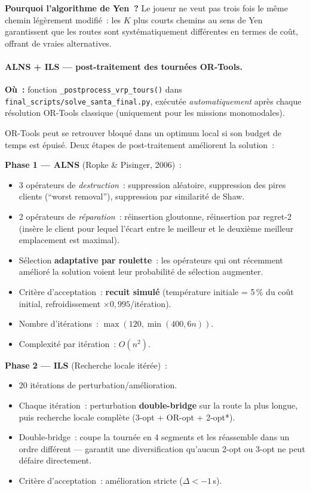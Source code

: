 \documentclass[a4paper, 12pt, twoside]{article}
\begin{document}
\textbf{Pourquoi l'algorithme de Yen~?}
Le joueur ne veut pas trois fois le m\^{e}me chemin l\'{e}g\`{e}rement modifi\'{e}~:
les $K$ plus courts chemins au sens de Yen garantissent que les routes sont
syst\'{e}matiquement diff\'{e}rentes en termes de co\^{u}t, offrant de vraies alternatives.

\paragraph{ALNS + ILS --- post-traitement des tourn\'{e}es OR-Tools.}

\textbf{O\`{u}~:} fonction \texttt{\_postprocess\_vrp\_tours()} dans
\texttt{final\_scripts/solve\_santa\_final.py}, ex\'{e}cut\'{e}e \emph{automatiquement}
apr\`{e}s chaque r\'{e}solution OR-Tools classique (uniquement pour les missions monomodales).

OR-Tools peut se retrouver bloqu\'{e} dans un optimum local si son budget de temps
est \'{e}puis\'{e}. Deux \'{e}tapes de post-traitement am\'{e}liorent la solution~:

\textbf{Phase 1 --- ALNS} (Ropke \& Pisinger, 2006)~:
\begin{itemize}
  \item 3 op\'{e}rateurs de \emph{destruction}~: suppression al\'{e}atoire, suppression
        des pires clients (``worst removal''), suppression par similarit\'{e} de Shaw.
  \item 2 op\'{e}rateurs de \emph{r\'{e}paration}~: r\'{e}insertion gloutonne, r\'{e}insertion
        par regret-2 (ins\`{e}re le client pour lequel l'\'{e}cart entre le meilleur et
        le deuxi\`{e}me meilleur emplacement est maximal).
  \item S\'{e}lection \textbf{adaptative par roulette}~: les op\'{e}rateurs qui ont
        r\'{e}cemment am\'{e}lior\'{e} la solution voient leur probabilit\'{e} de s\'{e}lection augmenter.
  \item Crit\`{e}re d'acceptation~: \textbf{recuit simul\'{e}} (temp\'{e}rature initiale = 5\,\%
        du co\^{u}t initial, refroidissement $\times 0{,}995$/it\'{e}ration).
  \item Nombre d'it\'{e}rations~: $\max(120, \min(400, 6n))$.
  \item Complexit\'{e} par it\'{e}ration~: $O(n^2)$.
\end{itemize}

\textbf{Phase 2 --- ILS} (Recherche locale it\'{e}r\'{e}e)~:
\begin{itemize}
  \item 20 it\'{e}rations de perturbation/am\'{e}lioration.
  \item Chaque it\'{e}ration~: perturbation \textbf{double-bridge} sur la route la plus
        longue, puis recherche locale compl\`{e}te (3-opt + OR-opt + 2-opt*).
  \item Double-bridge~: coupe la tourn\'{e}e en 4 segments et les r\'{e}assemble dans
        un ordre diff\'{e}rent --- garantit une diversification qu'aucun 2-opt
        ou 3-opt ne peut d\'{e}faire directement.
  \item Crit\`{e}re d'acceptation~: am\'{e}lioration stricte ($\Delta < -1$\,s).
\end{itemize}
\end{document}
